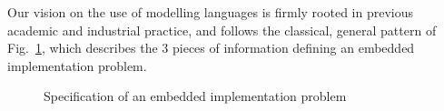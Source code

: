 \documentclass[a4paper,11pt]{article}
\begin{document}
Our vision on the use of modelling languages is firmly rooted in
previous academic and industrial practice, and follows the classical,
general pattern of Fig.~\ref{fig:relations}, which describes the 3
pieces of information defining an embedded implementation problem.
\begin{figure}[h]
 \begin{center}
 \end{center}
 \caption{Specification of an embedded implementation problem}
 \label{fig:relations}
 \end{figure}

\end{document}
